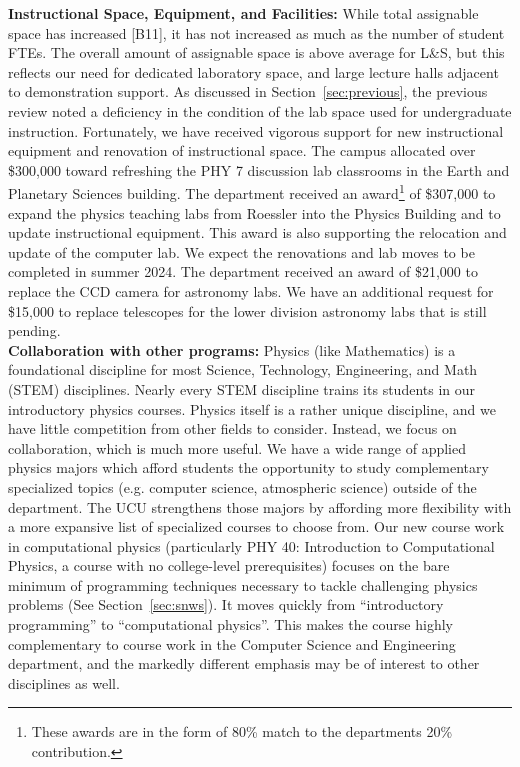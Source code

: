 \documentclass[12pt]{article}
\begin{document}
\noindent
{\bf Instructional Space, Equipment, and Facilities:} While total
assignable space has increased [B11], it has not increased as much as
the number of student FTEs.  The overall amount of assignable space is
above average for L\&S, but this reflects our need for dedicated
laboratory space, and large lecture halls adjacent to demonstration
support.  As discussed in Section~\ref{sec:previous}, the previous
review noted a deficiency in the condition of the lab space used for
undergraduate instruction.  Fortunately, we have received vigorous
support for new instructional equipment and renovation of
instructional space.  The campus allocated over \$300,000 toward
refreshing the PHY 7 discussion lab classrooms in the Earth and
Planetary Sciences building.  The department received an
award\footnote{These awards are in the form of 80\% match to the
  departments 20\% contribution.} of \$307,000 to expand the physics
teaching labs from Roessler into the Physics Building and to update
instructional equipment. This award is also supporting the relocation
and update of the computer lab. We expect the renovations and lab
moves to be completed in summer 2024.  The department received an
award of \$21,000 to replace the CCD camera for astronomy labs. We
have an additional request for \$15,000 to replace telescopes for the
lower division astronomy labs that is still pending.\\[3pt]

\noindent
{\bf Collaboration with other programs: } Physics (like Mathematics)
is a foundational discipline for most Science, Technology,
Engineering, and Math (STEM) disciplines.  Nearly every STEM
discipline trains its students in our introductory physics courses.
Physics itself is a rather unique discipline, and we have little
competition from other fields to consider.  Instead, we focus on
collaboration, which is much more useful.  We have a wide range of
applied physics majors which afford students the opportunity to
study complementary specialized topics (e.g. computer science,
atmospheric science) outside of the department.  The UCU strengthens
those majors by affording more flexibility with a more expansive list
of specialized courses to choose from.  Our new course work in
computational physics (particularly PHY 40: Introduction to
Computational Physics, a course with no college-level prerequisites)
focuses on the bare minimum of programming techniques necessary to
tackle challenging physics problems (See Section~\ref{sec:snws}).  It
moves quickly from ``introductory programming'' to ``computational
physics''.  This makes the course highly complementary to course work
in the Computer Science and Engineering department, and the markedly
different emphasis may be of interest to other disciplines as
well.\\[3pt]
\end{document}
